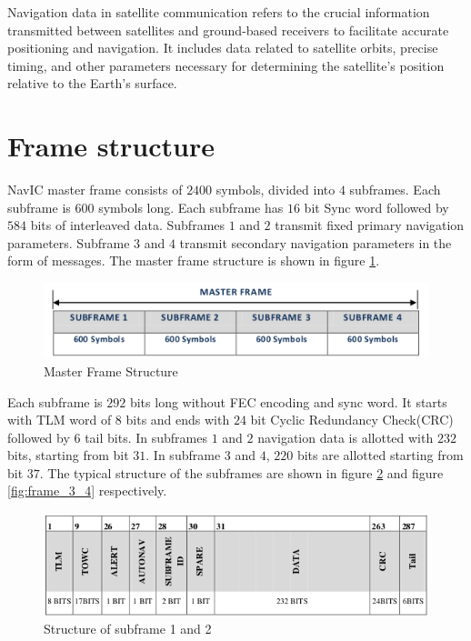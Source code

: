 
Navigation data in satellite communication refers to the crucial information transmitted between satellites and ground-based receivers to facilitate accurate positioning and navigation. It includes data related to satellite orbits, precise timing, and other parameters necessary for determining the satellite's position relative to the Earth's surface.
\section{Frame structure}
NavIC master frame consists of $2400$ symbols, divided into $4$ subframes. Each subframe is $600$ symbols long. Each subframe has $16$ bit Sync word followed by $584$ bits of interleaved data. Subframes $1$ and $2$ transmit fixed primary navigation parameters. Subframe $3$ and $4$ transmit secondary navigation parameters in the form of messages. The master frame structure is shown in figure \ref{fig:master_frame}. 

\begin{figure}[ht]
\centering
\includegraphics[width=0.8\columnwidth]{figs/master_frame.png}
\centering
\captionsetup{justification=centering}
\caption{Master Frame Structure}
\label{fig:master_frame}
\end{figure}

\noindent Each subframe is $292$ bits long without FEC encoding and sync word. It starts with TLM word of 8 bits and ends with $24$ bit Cyclic Redundancy Check(CRC) followed by $6$ tail bits. In subframes $1$ and $2$ navigation data is allotted with $232$ bits, starting from bit $31$. In subframe $3$ and $4$, $220$ bits are allotted starting from bit $37$. The typical structure of the subframes are shown in figure \ref{fig:frame_1_2} and figure \ref{fig:frame_3_4} respectively.

\begin{figure}[ht]
\centering
\includegraphics[width=0.8\columnwidth]{figs/1_2.png}
\centering
\captionsetup{justification=centering}
\caption{Structure of subframe 1 and 2}
\label{fig:frame_1_2}
\end{figure}

